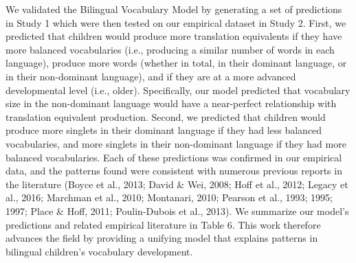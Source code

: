 \documentclass[
  english,
  ,man,floatsintext]{apa6}
\begin{document}
We validated the Bilingual Vocabulary Model by generating a set of predictions in Study 1 which were then tested on our empirical dataset in Study 2. First, we predicted that children would produce more translation equivalents if they have more balanced vocabularies (i.e., producing a similar number of words in each language), produce more words (whether in total, in their dominant language, or in their non-dominant language), and if they are at a more advanced developmental level (i.e., older). Specifically, our model predicted that vocabulary size in the non-dominant language would have a near-perfect relationship with translation equivalent production. Second, we predicted that children would produce more singlets in their dominant language if they had less balanced vocabularies, and more singlets in their non-dominant language if they had more balanced vocabularies. Each of these predictions was confirmed in our empirical data, and the patterns found were consistent with numerous previous reports in the literature (Boyce et al., 2013; David \& Wei, 2008; Hoff et al., 2012; Legacy et al., 2016; Marchman et al., 2010; Montanari, 2010; Pearson et al., 1993; 1995; 1997; Place \& Hoff, 2011; Poulin-Dubois et al., 2013). We summarize our model's predictions and related empirical literature in Table 6. This work therefore advances the field by providing a unifying model that explains patterns in bilingual children's vocabulary development.
\end{document}
